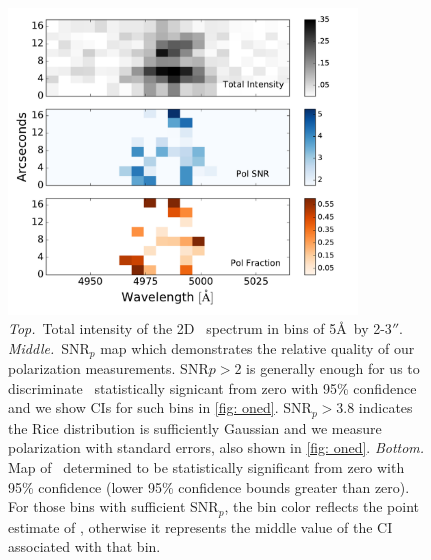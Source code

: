 \begin{figure}
\begin{center}
\includegraphics[width=3.65in]{Figures/lyapol/f5_v2.pdf}
\caption[2D total intensity, polarization signal-to-noise, and polarization map]{\textit{Top.}~Total intensity of the 2D \lya~spectrum in bins of 5\AA~by 2-3$''$. \textit{Middle.}~SNR$_p$ map which demonstrates the relative quality of our polarization measurements. SNR$p > 2$ is generally enough for us to discriminate \pol~statistically signicant from zero with 95\% confidence and we show CIs for such bins in \autoref{fig: oned}.  SNR$_p > 3.8$ indicates the Rice distribution is sufficiently Gaussian and we measure polarization with standard errors, also shown in \autoref{fig: oned}. \textit{Bottom.} Map of \pol~determined to be statistically significant from zero with 95\% confidence (lower 95\% confidence bounds greater than zero). For those bins with sufficient SNR$_p$, the bin color reflects the point estimate of \pol, otherwise it  represents the middle value of the CI associated with that bin.}
\label{fig: pol2d}
\end{center}
\end{figure}

